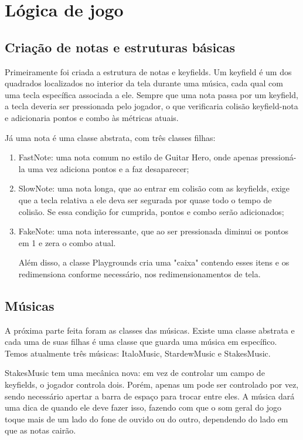 \section{Lógica de jogo}
    \subsection{Criação de notas e estruturas básicas} \label{chap:2}

    Primeiramente foi criada a estrutura de notas e keyfields. Um keyfield é um dos quadrados localizados no interior da tela durante uma música, cada qual com uma tecla específica associada a ele. Sempre que uma nota passa por um keyfield, a tecla deveria ser pressionada pelo jogador, o que verificaria colisão keyfield-nota e adicionaria pontos e combo às métricas atuais.

    Já uma nota é uma classe abstrata, com três classes filhas:
    \begin{enumerate}
        \item FastNote: uma nota comum no estilo de Guitar Hero, onde apenas pressioná-la uma vez adiciona pontos e a faz desaparecer;
        \item SlowNote: uma nota longa, que ao entrar em colisão com as keyfields, exige que a tecla relativa a ele deva ser segurada por quase todo o tempo de colisão. Se essa condição for cumprida, pontos e combo serão adicionados;
        \item FakeNote: uma nota interessante, que ao ser pressionada diminui os pontos em 1 e zera o combo atual. 

    Além disso, a classe Playgrounds cria uma "caixa" contendo esses itens e os redimensiona conforme necessário, nos redimensionamentos de tela.
    
    \end{enumerate}
    
    \subsection{Músicas}

    A próxima parte feita foram as classes das músicas. Existe uma classe abstrata e cada uma de suas filhas é uma classe que guarda uma música em específico. Temos atualmente três músicas: ItaloMusic, StardewMusic e StakesMusic.

    StakesMusic tem uma mecânica nova: em vez de controlar um campo de keyfields, o jogador controla dois. Porém, apenas um pode ser controlado por vez, sendo necessário apertar a barra de espaço para trocar entre eles. A música dará uma dica de quando ele deve fazer isso, fazendo com que o som geral do jogo toque mais de um lado do fone de ouvido ou do outro, dependendo do lado em que as notas cairão.

